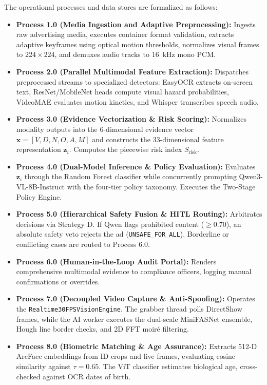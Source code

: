 \documentclass[12pt,a4paper]{report}
\begin{document}
The operational processes and data stores are formalized as follows:
\begin{itemize}
    \item \textbf{Process 1.0 (Media Ingestion and Adaptive Preprocessing):} Ingests raw advertising media, executes container format validation, extracts adaptive keyframes using optical motion thresholds, normalizes visual frames to $224 \times 224$, and demuxes audio tracks to 16~kHz mono PCM.
    \item \textbf{Process 2.0 (Parallel Multimodal Feature Extraction):} Dispatches preprocessed streams to specialized detectors: EasyOCR extracts on-screen text, ResNet/MobileNet heads compute visual hazard probabilities, VideoMAE evaluates motion kinetics, and Whisper transcribes speech audio.
    \item \textbf{Process 3.0 (Evidence Vectorization \& Risk Scoring):} Normalizes modality outputs into the 6-dimensional evidence vector $\mathbf{x} = [V, D, N, O, A, M]$ and constructs the 33-dimensional feature representation $\mathbf{z}_i$. Computes the piecewise risk index $S_{\text{risk}}$.
    \item \textbf{Process 4.0 (Dual-Model Inference \& Policy Evaluation):} Evaluates $\mathbf{z}_i$ through the Random Forest classifier while concurrently prompting Qwen3-VL-8B-Instruct with the four-tier policy taxonomy. Executes the Two-Stage Policy Engine.
    \item \textbf{Process 5.0 (Hierarchical Safety Fusion \& HITL Routing):} Arbitrates decisions via Strategy D. If Qwen flags prohibited content ($\ge 0.70$), an absolute safety veto rejects the ad (\texttt{UNSAFE\_FOR\_ALL}). Borderline or conflicting cases are routed to Process 6.0.
    \item \textbf{Process 6.0 (Human-in-the-Loop Audit Portal):} Renders comprehensive multimodal evidence to compliance officers, logging manual confirmations or overrides.
    \item \textbf{Process 7.0 (Decoupled Video Capture \& Anti-Spoofing):} Operates the \texttt{Realtime30FPSVisionEngine}. The grabber thread polls DirectShow frames, while the AI worker executes the dual-scale MiniFASNet ensemble, Hough line border checks, and 2D FFT moir\'{e} filtering.
    \item \textbf{Process 8.0 (Biometric Matching \& Age Assurance):} Extracts 512-D ArcFace embeddings from ID crops and live frames, evaluating cosine similarity against $\tau = 0.65$. The ViT classifier estimates biological age, cross-checked against OCR dates of birth.

\end{itemize}
\end{document}
